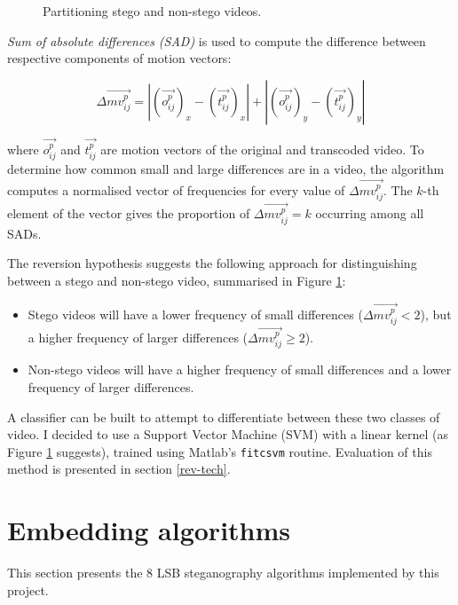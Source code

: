 \documentclass[12pt,british,twoside,notitlepage,usenames,dvipsnames,hypens,final]{report}
\numberwithin{equation}{section}
\numberwithin{figure}{section}
\begin{document}
\begin{figure}
\vspace{-15pt}
\centering
\resizebox{5.5cm}{!}{}
\caption{Partitioning stego and non-stego videos.}
\label{fig:movest-reversion-sketch}
\end{figure}

\emph{Sum of absolute differences (SAD)} is used to compute the difference between respective components of motion vectors:

$$ \Delta \overrightarrow{mv^p_{ij}} = |(\overrightarrow{o^p_{ij}})_x - (\overrightarrow{t^p_{ij}})_x| +  |(\overrightarrow{o^p_{ij}})_y - (\overrightarrow{t^p_{ij}})_y|$$

where $\overrightarrow{o^p_{ij}}$ and $\overrightarrow{t^p_{ij}}$ are motion vectors of the original and transcoded video. To determine how common small and large differences are in a video, the algorithm computes a normalised vector of frequencies for every value of $\Delta\overrightarrow{mv^p_{ij}}$. The $k$-th element of the vector gives the proportion of $\Delta\overrightarrow{mv^p_{ij}} = k$ occurring among all SADs.

The reversion hypothesis suggests the following approach for distinguishing between a stego and non-stego video, summarised in Figure \ref{fig:movest-reversion-sketch}:
\begin{itemize}
\item Stego videos will have a lower frequency of small differences ($\Delta\overrightarrow{mv^p_{ij}} < 2$), but a higher frequency of larger differences ($\Delta\overrightarrow{mv^p_{ij}} \geq 2$).
\item Non-stego videos will have a higher frequency of small differences and a lower frequency of larger differences.
\end{itemize}
A classifier can be built to attempt to differentiate between these two classes of video. I decided to use a Support Vector Machine (SVM) with a linear kernel (as Figure \ref{fig:movest-reversion-sketch} suggests), trained using Matlab's \texttt{fitcsvm} routine. Evaluation of this method is presented in section \ref{rev-tech}.

\section{Embedding algorithms}
\label{emb-alg}

This section presents the 8 LSB steganography algorithms implemented by this project.
\end{document}
